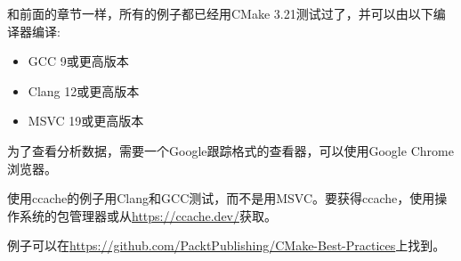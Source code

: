 和前面的章节一样，所有的例子都已经用CMake 3.21测试过了，并可以由以下编译器编译:

\begin{itemize}
\item 
GCC 9或更高版本

\item 
Clang 12或更高版本

\item 
MSVC 19或更高版本
\end{itemize}

为了查看分析数据，需要一个Google跟踪格式的查看器，可以使用Google Chrome浏览器。

使用ccache的例子用Clang和GCC测试，而不是用MSVC。要获得ccache，使用操作系统的包管理器或从\url{https://ccache.dev/}获取。

例子可以在\url{https://github.com/PacktPublishing/CMake-Best-Practices}上找到。










